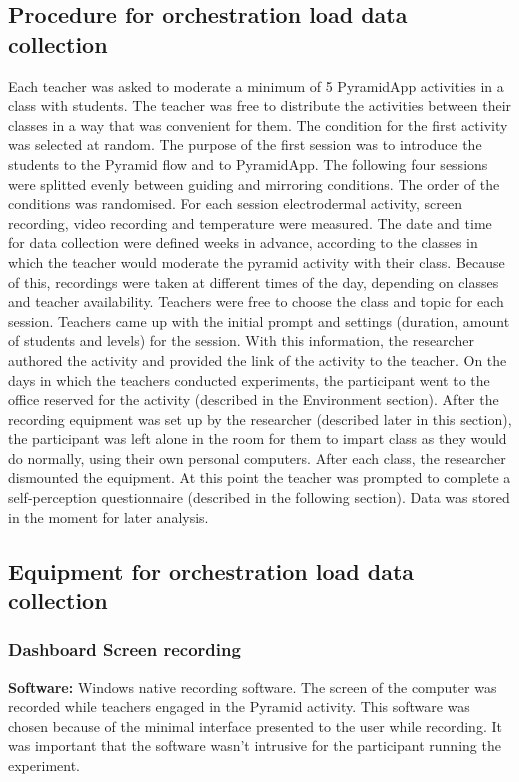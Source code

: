 \subsection{Procedure for orchestration load data collection }
Each teacher was asked to moderate a minimum of 5 PyramidApp activities in a class with  students. The teacher was free to distribute the activities between their classes in a way that was convenient for them. The condition for the first activity was selected at random. The purpose of the first session was to introduce the students to the Pyramid flow and to PyramidApp. The following four sessions were splitted evenly between guiding and mirroring conditions. The order of the conditions was randomised. For each session electrodermal activity, screen recording, video recording and temperature were measured.
The date and time for data collection were defined weeks in advance, according to the classes in which the teacher would moderate the pyramid activity with their class. Because of this, recordings were taken at different times of the day, depending on classes and teacher availability. Teachers were free to choose the class and topic for each session. Teachers came up with the initial prompt and settings (duration, amount of students and levels) for the session. With this information, the researcher authored the activity and provided the link of the activity to the teacher. On the days in which the teachers conducted experiments, the participant went to the office reserved for the activity (described in the Environment section). After the recording equipment was set up by the researcher (described later in this section), the participant was left alone in the room for them to impart class as they would do normally, using their own personal computers. After each class, the researcher dismounted the equipment. At this point the teacher was prompted to complete a self-perception questionnaire (described in the following section). Data was stored in the moment for later analysis.
\subsection{Equipment for orchestration load data collection}
\subsubsection{Dashboard Screen recording}
\textbf{Software:} Windows native recording software.
The screen of the computer was recorded while teachers engaged in the Pyramid activity. This software was chosen because of the minimal interface presented to the user while recording. It was important that the software wasn't intrusive for the participant running the experiment.
